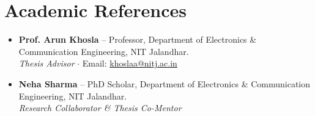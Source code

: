 \documentclass[10pt,a4paper]{article}
\begin{document}
\section*{Academic References}
\begin{itemize}
    \item \textbf{Prof. Arun Khosla} -- Professor, Department of Electronics \& Communication Engineering, NIT Jalandhar. \\
    \textit{Thesis Advisor} $\cdot$ Email: \href{mailto:khoslaa@nitj.ac.in}{khoslaa@nitj.ac.in}
    \item \textbf{Neha Sharma} -- PhD Scholar, Department of Electronics \& Communication Engineering, NIT Jalandhar. \\
    \textit{Research Collaborator \& Thesis Co-Mentor}
\end{itemize}
\end{document}
